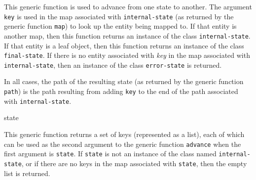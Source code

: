 This generic function is used to advance from one state to another.
The argument \texttt{key} is used in the map associated with
\texttt{internal-state} (as returned by the generic function
\texttt{map}) to look up the entity being mapped to.  If that entity
is another map, then this function returns an instance of the class
\texttt{internal-state}.  If that entity is a leaf object, then this
function returns an instance of the class \texttt{final-state}.  If
there is no entity associated with \emph{key} in the map associated
with \texttt{internal-state}, then an instance of the class
\texttt{error-state} is returned.

In all cases, the path of the resulting state (as returned by the
generic function \texttt{path}) is the path resulting from adding
\texttt{key} to the end of the path associated with
\texttt{internal-state}.

 {state}

This generic function returns a set of keys (represented as a list),
each of which can be used as the second argument to the generic
function \texttt{advance} when the first argument is \texttt{state}.
If \texttt{state} is not an instance of the class named
\texttt{internal-state}, or if there are no keys in the map associated
with \texttt{state}, then the empty list is returned.
